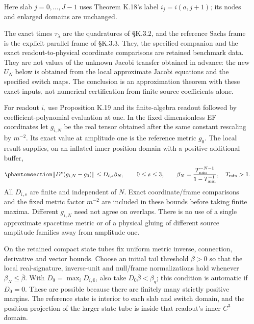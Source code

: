 \documentclass[
  english,
  11pt,
  reqno]{amsart}
\begin{document}
Here slab \(j=0,\ldots,J-1\) uses Theorem K.18's label \(i_j=i(a,j+1)\);
its nodes and enlarged domains are unchanged.

The exact times \(\tau_\lambda\) are the quadratures of §K.3.2, and the
reference Sachs frame is the explicit parallel frame of §K.3.3. They,
the specified companion and the exact readout-to-physical coordinate
comparisons are retained benchmark data. They are not values of the
unknown Jacobi transfer obtained in advance: the new \(U_N\) below is
obtained from the local approximate Jacobi equations and the specified
switch maps. The conclusion is an approximation theorem with these exact
inputs, not numerical certification from finite source coefficients
alone.

For readout \(i\), use Proposition K.19 and its finite-algebra readout
followed by coefficient-polynomial evaluation at one. In the fixed
dimensionless EF coordinates let \(g_{i,N}\) be the real tensor obtained
after the same constant rescaling by \(m^{-2}\). Its exact value at
amplitude one is the reference metric \(g_0\). The local result
supplies, on an inflated inner position domain with a positive
additional buffer,
\begin{equation}\protect\phantomsection\label{eq:fr-opt-c-local-metric-tail}{
 \|D^s(g_{i,N}-g_0)\|\le D_{i,s}\beta_N,
 \qquad 0\le s\le3,\qquad
 \beta_N=\frac{T_{\min}^{-N-1}}{1-T_{\min}^{-1}},
 \quad T_{\min}>1.
}\end{equation} All \(D_{i,s}\) are finite and independent of \(N\).
Exact coordinate/frame comparisons and the fixed metric factor
\(m^{-2}\) are included in these bounds before taking finite maxima.
Different \(g_{i,N}\) need not agree on overlaps. There is no use of a
single approximate spacetime metric or of a physical gluing of different
source amplitude families away from amplitude one.

On the retained compact state tubes fix uniform metric inverse,
connection, derivative and vector bounds. Choose an initial tail
threshold \(\bar\beta>0\) so that the local real-signature, inverse-unit
and null/frame normalizations hold whenever \(\beta_N\le\bar\beta\).
With \(D_0=\max_iD_{i,0}\), also take \(D_0\bar\beta<\beta_g\); this
condition is automatic if \(D_0=0\). These are possible because there
are finitely many strictly positive margins. The reference state is
interior to each slab and switch domain, and the position projection of
the larger state tube is inside that readout's inner \(C^3\) domain.
\end{document}
